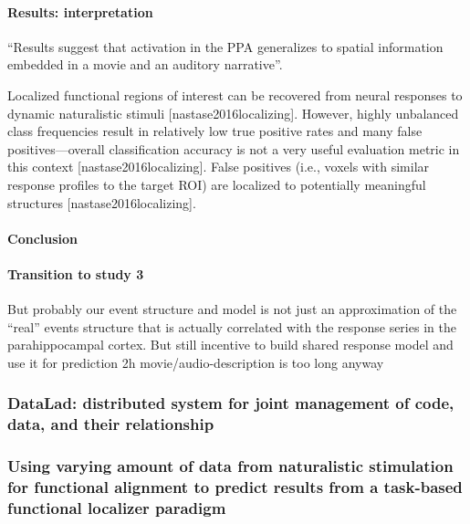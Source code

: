 \paragraph{Results: interpretation}

``Results suggest that activation in the PPA generalizes to spatial information
embedded in a movie and an auditory narrative''.



%
Localized functional regions of interest can be recovered from neural responses
to dynamic naturalistic stimuli [nastase2016localizing].
%
However, highly unbalanced class frequencies result in relatively low true
positive rates and many false positives—overall classification accuracy is not a
very useful evaluation metric in this context [nastase2016localizing].
%
False positives (i.e., voxels with similar response profiles to the target ROI)
are localized to potentially meaningful structures
[nastase2016localizing].

\paragraph{Conclusion}


\paragraph{Transition to study 3}

%
But probably our event structure and model is not just an approximation of the
``real'' events structure that is actually correlated with the response series
in the parahippocampal cortex.
%
But still incentive to build shared response model and use it for prediction
%
2h movie/audio-description is too long anyway


\subsubsection{DataLad: distributed system for joint management of code, data,
and their relationship}



\subsubsection{Using varying amount of data from naturalistic stimulation for
functional alignment to predict results from a task-based functional localizer
paradigm}

